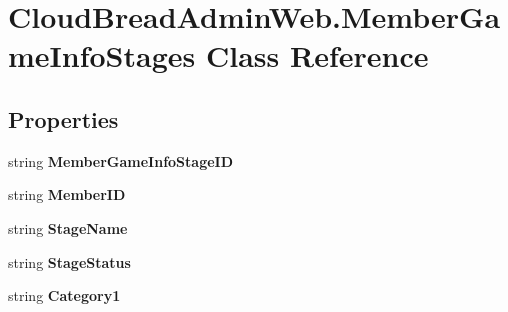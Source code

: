 \hypertarget{class_cloud_bread_admin_web_1_1_member_game_info_stages}{}\section{Cloud\+Bread\+Admin\+Web.\+Member\+Game\+Info\+Stages Class Reference}
\label{class_cloud_bread_admin_web_1_1_member_game_info_stages}
\subsection*{Properties}
\begin{DoxyCompactItemize}
\item 
string {\bfseries Member\+Game\+Info\+Stage\+ID}\hypertarget{class_cloud_bread_admin_web_1_1_member_game_info_stages_ab9031eb532c379930fa610914a7b4041}{}\label{class_cloud_bread_admin_web_1_1_member_game_info_stages_ab9031eb532c379930fa610914a7b4041}

\item 
string {\bfseries Member\+ID}\hypertarget{class_cloud_bread_admin_web_1_1_member_game_info_stages_ae56d8768e8b466b39324f0fcb73f10d4}{}\label{class_cloud_bread_admin_web_1_1_member_game_info_stages_ae56d8768e8b466b39324f0fcb73f10d4}

\item 
string {\bfseries Stage\+Name}\hypertarget{class_cloud_bread_admin_web_1_1_member_game_info_stages_a08c65bea59ea411455441934031f5f38}{}\label{class_cloud_bread_admin_web_1_1_member_game_info_stages_a08c65bea59ea411455441934031f5f38}

\item 
string {\bfseries Stage\+Status}\hypertarget{class_cloud_bread_admin_web_1_1_member_game_info_stages_a872ebd4d56d9312df0d77164cc66a679}{}\label{class_cloud_bread_admin_web_1_1_member_game_info_stages_a872ebd4d56d9312df0d77164cc66a679}

\item 
string {\bfseries Category1}\hypertarget{class_cloud_bread_admin_web_1_1_member_game_info_stages_a65437ef048caa43107af1b4a225d466b}{}\label{class_cloud_bread_admin_web_1_1_member_game_info_stages_a65437ef048caa43107af1b4a225d466b}


\end{DoxyCompactItemize}
